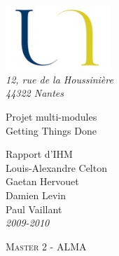 \begin{titlepage}

\vspace*{2cm}



\begin{flushleft}
	\hspace{1cm} \includegraphics*[width=4cm]{diagrams/logo.jpg}\\
	\hspace{1cm} \textsl{12, rue de la Houssinière}\\
	\hspace{1cm} \textit{44322 Nantes}
	\hrulefill
\end{flushleft}




\vspace{2cm}

\begin{flushright}

	{\fontsize{1.4cm}{1.65cm}\selectfont 
Projet multi-modules } 	 \\
	{\fontsize{0.7cm}{0.825cm}\selectfont 
Getting Things Done} 	 \\

	
	\vspace{1cm}
	
	{\Large 
	Rapport d'IHM
	}\\
	
	\vspace{1cm}
	Louis-Alexandre Celton \\
	Gaetan Hervouet \\
	Damien Levin \\
	Paul Vaillant \\
	\textit{2009-2010}
	
\end{flushright}


\vspace{2cm}

\begin{flushleft}



	\hspace{1cm} \textsc{Master 2 - ALMA}\\
	
\end{flushleft}

\hspace*{0,5cm}\hrulefill
\end{titlepage}
